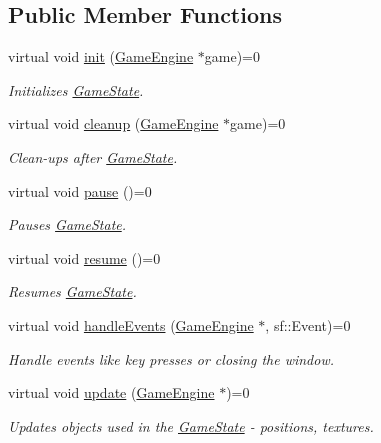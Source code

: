 \subsection*{Public Member Functions}
\begin{DoxyCompactItemize}
\item 
virtual void \mbox{\hyperlink{class_game_state_a10b6e6bb31591c70d08ffcee5f29fa81}{init}} (\mbox{\hyperlink{class_game_engine}{Game\+Engine}} $\ast$game)=0
\begin{DoxyCompactList}\small\item\em Initializes \mbox{\hyperlink{class_game_state}{Game\+State}}. \end{DoxyCompactList}\item 
virtual void \mbox{\hyperlink{class_game_state_a7df4ea0b4815d2b3b35dbec2a399a0b6}{cleanup}} (\mbox{\hyperlink{class_game_engine}{Game\+Engine}} $\ast$game)=0
\begin{DoxyCompactList}\small\item\em Clean-\/ups after \mbox{\hyperlink{class_game_state}{Game\+State}}. \end{DoxyCompactList}\item 
virtual void \mbox{\hyperlink{class_game_state_aafc908582760099891b37bb380ddd87a}{pause}} ()=0
\begin{DoxyCompactList}\small\item\em Pauses \mbox{\hyperlink{class_game_state}{Game\+State}}. \end{DoxyCompactList}\item 
virtual void \mbox{\hyperlink{class_game_state_a4a421c44f4dae6e9a4fbe10b6e8c47ac}{resume}} ()=0
\begin{DoxyCompactList}\small\item\em Resumes \mbox{\hyperlink{class_game_state}{Game\+State}}. \end{DoxyCompactList}\item 
virtual void \mbox{\hyperlink{class_game_state_a3ef0638514dbfe71581d593cf0f66ce5}{handle\+Events}} (\mbox{\hyperlink{class_game_engine}{Game\+Engine}} $\ast$, sf\+::\+Event)=0
\begin{DoxyCompactList}\small\item\em Handle events like key presses or closing the window. \end{DoxyCompactList}\item 
virtual void \mbox{\hyperlink{class_game_state_a66b11afe355a9479f94aaf76576980bd}{update}} (\mbox{\hyperlink{class_game_engine}{Game\+Engine}} $\ast$)=0
\begin{DoxyCompactList}\small\item\em Updates objects used in the \mbox{\hyperlink{class_game_state}{Game\+State}} -\/ positions, textures. \end{DoxyCompactList}\item 

\end{DoxyCompactItemize}
